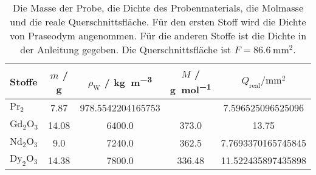\begin{table}\caption{Die Masse der Probe, die Dichte des Probenmaterials, die Molmasse und die reale Querschnittsfläche. Für den ersten Stoff wird die Dichte von Praseodym angenommen. Für die anderen Stoffe ist die Dichte in der Anleitung gegeben. Die Querschnittsfläche ist $F = \SI{86.6}{\milli\meter\squared}$.}
\label{tab2}
\centering
{}
\begin{tabular}{l S S S S} 
\toprule
{Stoffe} & {$m$ / \si{\gram}} & {$\rho_\text{W}$ / \si[per-mode=fraction]{\kilo\gram\per\cubic\meter}} & {$M$ / \si[per-mode=fraction]{\gram\per\mol}} & {$Q_\text{real} / \si{\milli\meter\squared}$}\\
\midrule
$\text{Pr}_2$  & 7.87 & 978.5542204165753 &   & 7.596525096525096\\
$\text{Gd}_2 \text{O}_3$         & 14.08 & 6400.0 & 373.0             & 13.75\\
$\text{Nd}_2 \text{O}_3$         & 9.0 & 7240.0 & 362.5               & 7.7693370165745845\\
$\text{Dy}_2 \text{O}_3$         & 14.38 & 7800.0 & 336.48            & 11.522435897435898\\
\bottomrule
\end{tabular}\end{table}
